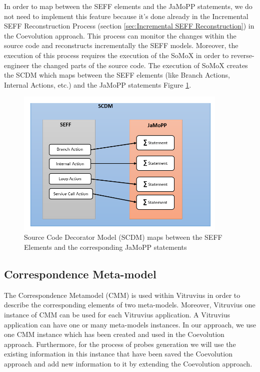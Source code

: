 In order to map between the SEFF elements and the JaMoPP statements, we do not need to implement this feature because it's done already in the Incremental SEFF Reconstruction Process (section \ref{sec:Incremental SEFF Reconstruction}) in the Coevolution approach. This process can monitor the changes within the source code and reconstructs incrementally the SEFF models. Moreover, the execution of this process requires the execution of the SoMoX in order to reverse-engineer the changed parts of the source code. The execution of SoMoX creates the SCDM which maps between the SEFF elements (like Branch Actions, Internal Actions, etc.) and the JaMoPP statements Figure \ref{fig:seff jamopp}.


\begin{figure}[h]
\centering
\includegraphics[width=0.9\textwidth]{figures/seff_jamopp}
\caption{Source Code Decorator Model (SCDM) maps between the SEFF Elements and the corresponding JaMoPP statements}
\label{fig:seff jamopp}
\end{figure}



\subsection{Correspondence Meta-model}
\label{sec:Correspondence Meta-model}
The Correspondence Metamodel (CMM) is used within Vitruvius in order to describe the corresponding elements of two meta-models. Moreover, Vitruvius one instance of CMM can be used for each Vitruvius application. A Vitruvius application can have one or many meta-models instances.  In our approach, we use one CMM instance which has been created and used in the Coevolution approach. Furthermore, for the process of probes generation we will use the existing information in this instance that have been saved the Coevolution approach and add new information to it by extending the Coevolution approach.\\

